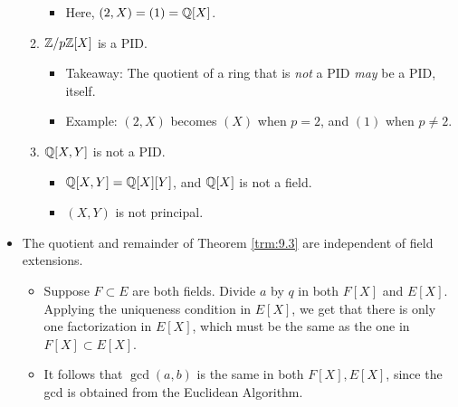 \documentclass[../notes.tex]{subfiles}
\begin{document}
\begin{itemize}
\begin{enumerate}
        \begin{itemize}
            \item Here, $(2,X)=(1)=\mathbb{Q}[X]$.
        \end{itemize}
        \item $\mathbb{Z}/p\mathbb{Z}[X]$ is a PID.
        \begin{itemize}
            \item Takeaway: The quotient of a ring that is \emph{not} a PID \emph{may} be a PID, itself.
            \item Example: $(2,X)$ becomes $(X)$ when $p=2$, and $(1)$ when $p\neq 2$.
        \end{itemize}
        \item $\mathbb{Q}[X,Y]$ is not a PID.
        \begin{itemize}
            \item $\mathbb{Q}[X,Y]=\mathbb{Q}[X][Y]$, and $\mathbb{Q}[X]$ is not a field.
            \item $(X,Y)$ is not principal.
        \end{itemize}
    \end{enumerate}
    \item The quotient and remainder of Theorem \ref{trm:9.3} are independent of field extensions.
    \begin{itemize}
        \item Suppose $F\subset E$ are both fields. Divide $a$ by $q$ in both $F[X]$ and $E[X]$. Applying the uniqueness condition in $E[X]$, we get that there is only one factorization in $E[X]$, which must be the same as the one in $F[X]\subset E[X]$.
        \item It follows that $\gcd(a,b)$ is the same in both $F[X],E[X]$, since the gcd is obtained from the Euclidean Algorithm.
    \end{itemize}
\end{itemize}
\end{document}
